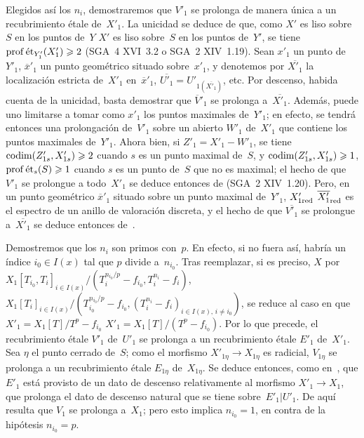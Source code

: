 Elegidos así los $n_{i}$, demostraremos que $V'_{1}$ se prolonga de
manera única a un recubrimiento étale de~$X'_{1}$. La unicidad se
deduce de que, como
{$X'$ es liso sobre~$S$ en los puntos de~$Y$}
{$X'$ es liso sobre~$S$ en los puntos de~$Y'$},
se tiene $\operatorname{prof}\mathrm{\acute{e}t}_{Y'_{1}}(X'_{1})\geqslant 2$ (SGA~4 XVI~3.2 o
SGA~2 XIV~1.19). Sean $x'_{1}$ un punto de~$Y'_{1}$,
$\overline{x}'_{1}$ un punto geométrico situado sobre~$x'_{1}$, y
denotemos por $\overline{X'_{1}}$ la localización estricta de~$X'_{1}$
en~$\overline{x}'_{1}$, $\overline{U'_{1}}=U'_{1(\overline{X'_{1}})}$,
etc. Por descenso, habida cuenta de la unicidad, basta demostrar que
$\overline{V}'_{1}$ se prolonga a~$\overline{X'_{1}}$. Además, puede
uno limitarse a tomar como $x'_{1}$ los puntos maximales de~$Y'_{1}$;
en efecto, se tendrá entonces una prolongación de~$V'_{1}$ sobre un
abierto $W'_{1}$ de~$X'_{1}$ que contiene los puntos maximales
de~$Y'_{1}$. Ahora bien, si $Z'_{1}=X'_{1}-W'_{1}$, se tiene
$\operatorname{codim}(Z'_{1s},X'_{1s})\geqslant 2$ cuando $s$ es un punto maximal
de~$S$, y $\operatorname{codim}(Z'_{1s},X'_{1s})\geqslant 1$,
$\operatorname{prof}\mathrm{\acute{e}t}_{s}(S)\geqslant 1$ cuando $s$ es un punto de~$S$ que no es
maximal; el hecho de que $V'_{1}$ se prolongue a todo~$X'_{1}$ se deduce
entonces de (SGA~2 XIV~1.20). Pero, en un punto geométrico
$\overline{x}'_{1}$ situado sobre un punto maximal de~$Y'_{1}$,
{$X'_{1\mathrm{red}}$}
{$\overline{X'_{1}}_{\mathrm{red}}$}
es el espectro de un anillo de valoración discreta, y el hecho de que
$\overline{V'_{1}}$ se prolongue a~$\overline{X'_{1}}$ se deduce entonces
de~.

Demostremos que los $n_{i}$ son primos con~$p$. En efecto, si no fuera
así, habría un índice $i_{0}\in I(x)$ tal que $p$ divide a~$n_{i_{0}}$.
Tras reemplazar, si es preciso, $X$ por
{$X_{1}[T_{i_{0}},T_{i}]_{i\in I(x)}\big/
(T_{i}^{n_{i_{0}}/p}-f_{i_{0}},T_{i}^{n_{i}}-f_{i})$,}
{$X_{1}[T_{i}]_{i\in I(x)}\big/
(T_{i_{0}}^{n_{i_{0}}/p}-f_{i_{0}},
(T_{i}^{n_{i}}-f_{i})_{i\in I(x),\,i\ne i_{0}})$,}
se reduce al caso en que
{$X'_{1}=X_{1}[T]/T^{p}-f_{i_{0}}$}
{$X'_{1}=X_{1}[T]/(T^{p}-f_{i_{0}})$}.
Por lo que
precede, el recubrimiento
étale $V'_{1}$ de~$U'_{1}$ se prolonga a un recubrimiento étale $E'_{1}$
de~$X'_{1}$. Sea $\eta$ el punto cerrado de~$S$; como el morfismo
$X'_{1\eta}\to X_{1\eta}$ es radicial, $V_{1\eta}$ se prolonga a un
recubrimiento étale $E_{1\eta}$ de~$X_{1\eta}$. Se deduce entonces,
como en~, que $E'_{1}$ está provisto de un dato de descenso
relativamente al morfismo $X'_{1}\to X_{1}$, que prolonga el dato de
descenso natural que se tiene sobre~$E'_{1}|U'_{1}$. De aquí resulta que
$V_{1}$ se prolonga a~$X_{1}$; pero esto implica $n_{i_{0}}=1$, en
contra de la hipótesis $n_{i_{0}}=p$.
